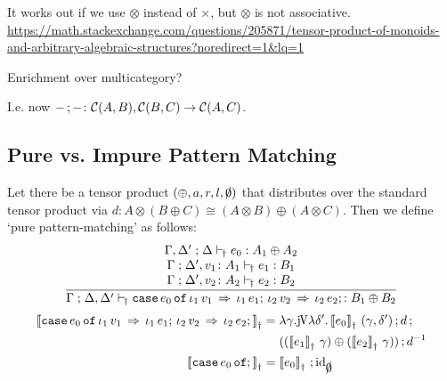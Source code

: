 \documentclass[runningheads,envcountsame]{llncs}
\begin{document}
It works out if we use $\otimes$ instead of $\times$, but $\otimes$ is not associative. \url{https://math.stackexchange.com/questions/205871/tensor-product-of-monoids-and-arbitrary-algebraic-structures?noredirect=1&lq=1}

Enrichment over multicategory?

I.e. now $\comp{-}{-}\colon \homC{A}{B}, \homC{B}{C} \to \homC{A}{C}$.

\subsection{Pure vs. Impure Pattern Matching}

Let there be a tensor product $(\oplus, a, r, l, \slashzero)$ that distributes over the standard tensor product via $d\colon A \otimes (B \oplus C) \cong (A \otimes B) \oplus (A \otimes C)$. Then we define ‘pure pattern-matching’ as follows:
\begin{gather}
    \dfrac{\begin{array}{c}
        \typeruled{\Gamma,\Delta'}{\Delta}{e_0}{j}{A_1 \oplus  A_2} \\
        \typeruled{\Gamma}{\Delta', v_1\colon A_1}{e_1}{j}{B_1} \\
        \typeruled{\Gamma}{\Delta', v_2\colon A_2}{e_2}{j}{B_2}
    \end{array}}{
        \typeruled{\Gamma}{\Delta, \Delta'}{\ecaseof{e_0}{\ecase{\eapp{\iota_1}{v_1}}{\eapp{\iota_1}{e_1}} \ecase{\eapp{\iota_2}{v_2}}{\eapp{\iota_2}{e_2}}}}{j}{B_1 \oplus B_2}
    }
\end{gather}
\begin{align}
    \semD{\ecaseof{e_0}{\ecase{\eapp{\iota_1}{v_1}}{\eapp{\iota_1}{e_1}}
                        \ecase{\eapp{\iota_2}{v_2}}{\eapp{\iota_2}{e_2}}}} &= \elam{\gamma}{
        \comp{\juncurry{\elam{\delta'}{\eapp{\semD{e_0}}{(\gamma, \delta')}}}}{\comp{d}} \\
        & \mathrel{\phantom{=}} \comp{((\eapp{\semD{e_1}}{\gamma}) \oplus (\eapp{\semD{e_2}}{\gamma}))}{d^{-1}} \nonumber \\
    \semD{\ecaseof{e_0}{;}} &= \comp{\semD{e_0}}{\id_{\slashzero}}}
\end{align}
\end{document}
